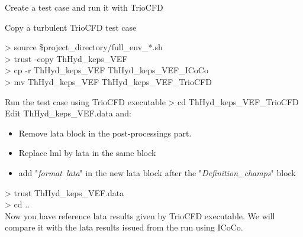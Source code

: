 \documentclass[10pt, hyperref={unicode=true,pdfusetitle, bookmarks=true,bookmarksnumbered=false,bookmarksopen=false, breaklinks=false,pdfborder={0 0 1},backref=true,colorlinks=true,linkcolor=darkblue,pageanchor, urlcolor=darkblue}]{beamer}
\begin{document}
\begin{frame}{Create a test case and run it with TrioCFD}

\begin{block}{Copy a turbulent TrioCFD test case}

    > source \$project\_directory/full\_env\_*.sh \\
    > trust -copy ThHyd\_keps\_VEF \\
    > cp -r ThHyd\_keps\_VEF ThHyd\_keps\_VEF\_ICoCo \\
    > mv ThHyd\_keps\_VEF ThHyd\_keps\_VEF\_TrioCFD \\
\end{block}

\begin{block}{Run the test case using TrioCFD executable}
    > cd ThHyd\_keps\_VEF\_TrioCFD \\
    Edit ThHyd\_keps\_VEF.data and:
    \begin{itemize}
    \item Remove lata block in the post-processings part.
    \item Replace lml by lata in the same block
    \item add "\textit{format\ lata}" in the new lata block after the  "\textit{Definition\_champs}" block\\
    \end{itemize}

    > trust ThHyd\_keps\_VEF.data\\
    > cd ..\\
    Now you have reference lata results given by TrioCFD executable. We will compare it with the lata results issued from the run using ICoCo.
\end{block}

\end{frame}
\end{document}
